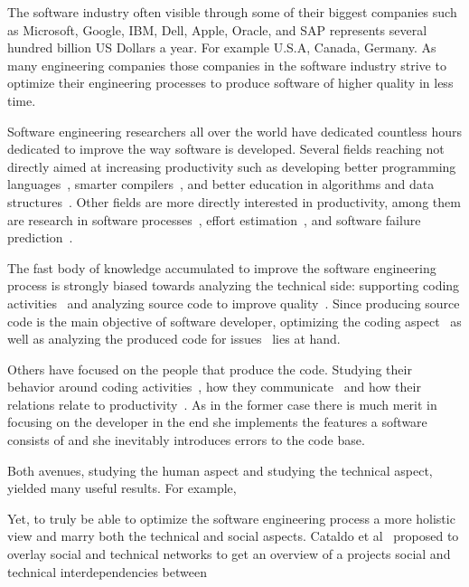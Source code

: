 The software industry often visible through some of their biggest companies such as Microsoft, Google, IBM, Dell, Apple, Oracle, and SAP represents several hundred billion US Dollars a year. 
For example  U.S.A, Canada, Germany.
As many engineering companies those companies in the software industry strive to optimize their engineering processes to produce software of higher quality in less time.

Software engineering researchers all over the world have dedicated countless hours dedicated to improve the way software is developed.
Several fields reaching not directly aimed at increasing productivity such as developing better programming languages~\cite{}, smarter compilers~\cite{}, and better education in algorithms and data structures~\cite{}.
Other fields are more directly interested in productivity, among them are research in software processes~\cite{}, effort estimation~\cite{}, and software failure prediction~\cite{}.

The fast body of knowledge accumulated to improve the software engineering process is strongly biased towards analyzing the technical side: supporting coding activities~\cite{} and analyzing source code to improve quality~\cite{}. 
Since producing source code is the main objective of software developer, optimizing the coding aspect~\cite{} as well as analyzing the produced code for issues~\cite{} lies at hand.

Others have focused on the people that produce the code. Studying their behavior around coding activities~\cite{}, how they communicate~\cite{} and how their relations relate to productivity~\cite{}.
As in the former case there is much merit in focusing on the developer in the end she implements the features a software consists of and she inevitably introduces errors to the code base.

Both avenues, studying the human aspect and studying the technical aspect, yielded many useful results.
For example,  

Yet, to truly be able to optimize the software engineering process a more holistic view and marry both the technical and social aspects.
Cataldo et al~\cite{} proposed to overlay social and technical networks to get an overview of a projects social and technical interdependencies between 







